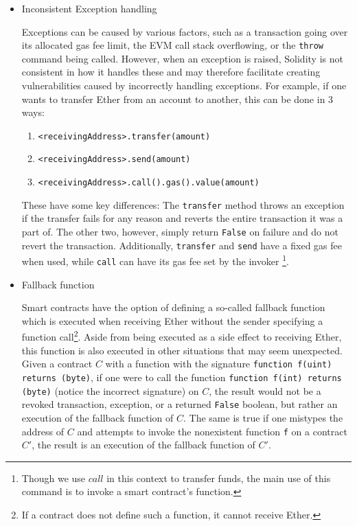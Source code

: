 \documentclass[letterpaper,twocolumn,10pt]{article}
\begin{document}
\begin{itemize}
  \item Inconsistent Exception handling
	
	Exceptions can be caused by various factors, such as a transaction going over its allocated gas fee limit, the EVM call stack overflowing, or the \verb|throw| command being called. However, when an exception is raised, Solidity is not consistent in how it handles these and may therefore facilitate creating vulnerabilities caused by incorrectly handling exceptions. For example, if one wants to transfer Ether from an account to another, this can be done in 3 ways: 
	\begin{enumerate}
	\item \verb|<receivingAddress>.transfer(amount)| 
	\item \verb|<receivingAddress>.send(amount)|
	\item \verb|<receivingAddress>.call().gas().value(amount)|
	\end{enumerate}
	
	These have some key differences: The \verb|transfer| method throws an exception if the transfer fails for any reason and reverts the entire transaction it was a part of. The other two, however, simply return \verb|False| on failure and do not revert the transaction. Additionally, \verb|transfer| and \verb|send| have a fixed gas fee when used, while \verb|call| can have its gas fee set by the invoker \footnote{Though we use $call$ in this context to transfer funds, the main use of this command is to invoke a smart contract's function.}. 
  \item Fallback function
  
  Smart contracts have the option of defining a so-called fallback function which is executed when receiving Ether without the sender specifying a function call\footnote{If a contract does not define such a function, it cannot receive Ether.}. Aside from being executed as a side effect to receiving Ether, this function is also executed in other situations that may seem unexpected. Given a contract $C$ with a function with the signature \verb|function f(uint) returns (byte)|, if one were to call the function \verb|function f(int) returns (byte)| (notice the incorrect signature) on $C$, the result would not be a revoked transaction, exception, or a returned \verb|False| boolean, but rather an execution of the fallback function of $C$. The same is true if one mistypes the address of $C$ and attempts to invoke the nonexistent function \verb|f| on a contract $C'$, the result is an execution of the fallback function of $C'$. 
  

\end{itemize}
\end{document}
